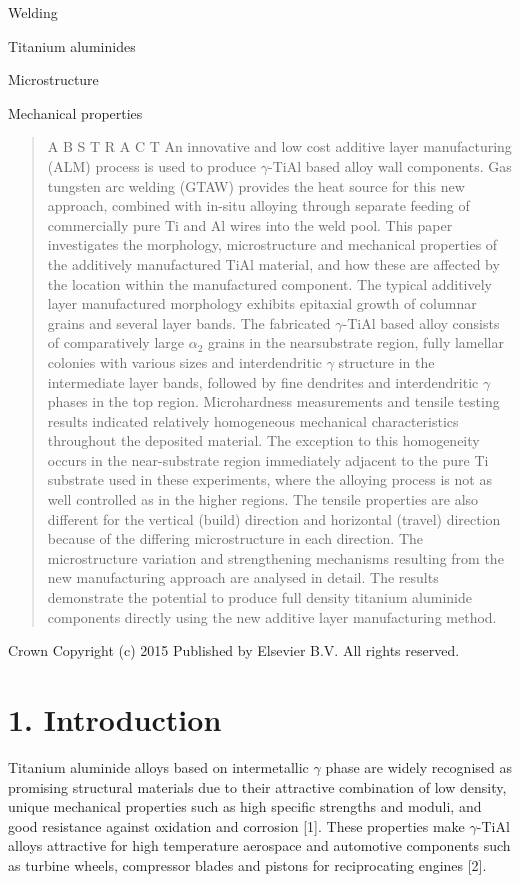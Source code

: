 \documentclass[10pt]{article}
\begin{document}
Welding

Titanium aluminides

Microstructure

Mechanical properties

\begin{abstract}
A B S T R A C T An innovative and low cost additive layer manufacturing (ALM) process is used to produce $\gamma$-TiAl based alloy wall components. Gas tungsten arc welding (GTAW) provides the heat source for this new approach, combined with in-situ alloying through separate feeding of commercially pure $\mathrm{Ti}$ and $\mathrm{Al}$ wires into the weld pool. This paper investigates the morphology, microstructure and mechanical properties of the additively manufactured TiAl material, and how these are affected by the location within the manufactured component. The typical additively layer manufactured morphology exhibits epitaxial growth of columnar grains and several layer bands. The fabricated $\gamma$-TiAl based alloy consists of comparatively large $\alpha_{2}$ grains in the nearsubstrate region, fully lamellar colonies with various sizes and interdendritic $\gamma$ structure in the intermediate layer bands, followed by fine dendrites and interdendritic $\gamma$ phases in the top region. Microhardness measurements and tensile testing results indicated relatively homogeneous mechanical characteristics throughout the deposited material. The exception to this homogeneity occurs in the near-substrate region immediately adjacent to the pure Ti substrate used in these experiments, where the alloying process is not as well controlled as in the higher regions. The tensile properties are also different for the vertical (build) direction and horizontal (travel) direction because of the differing microstructure in each direction. The microstructure variation and strengthening mechanisms resulting from the new manufacturing approach are analysed in detail. The results demonstrate the potential to produce full density titanium aluminide components directly using the new additive layer manufacturing method.
\end{abstract}

Crown Copyright (c) 2015 Published by Elsevier B.V. All rights reserved.

\section*{1. Introduction}
Titanium aluminide alloys based on intermetallic $\gamma$ phase are widely recognised as promising structural materials due to their attractive combination of low density, unique mechanical properties such as high specific strengths and moduli, and good resistance against oxidation and corrosion [1]. These properties make $\gamma$-TiAl alloys attractive for high temperature aerospace and automotive components such as turbine wheels, compressor blades and pistons for reciprocating engines [2].
\end{document}
